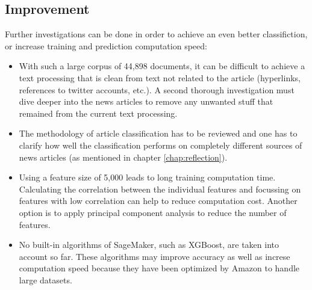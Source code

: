 \documentclass[a4paper,12pt,nottoc]{article}
\begin{document}
\subsection{Improvement}

Further investigations can be done in order to achieve an even better classifiction, or increase training and prediction computation speed:

\begin{itemize}
\item{With such a large corpus of 44,898 documents, it can be difficult to achieve a text processing that is clean from text not related to the article (hyperlinks, references to twitter accounts, etc.). A second thorough investigation must dive deeper into the news articles to remove any unwanted stuff that remained from the current text processing.}
\item{The methodology of article classification has to be reviewed and one has to clarify how well the classification performs on completely different sources of news articles (as mentioned in chapter \ref{chap:reflection}).}
\item{Using a feature size of 5,000 leads to long training computation time. Calculating the correlation between the individual features and focussing on features with low correlation can help to reduce computation cost. Another option is to apply principal component analysis to reduce the number of features.}
\item{No built-in algorithms of SageMaker, such as XGBoost, are taken into account so far. These algorithms may improve accuracy as well as increse computation speed because they have been optimized by Amazon to handle large datasets.}
\end{itemize}
\end{document}
